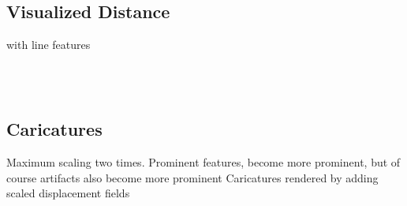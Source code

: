 \subsection{Visualized Distance}
with line features
\begin{figure}[h]
    \centering
    \\
    \\
    \caption{}
\label{fig:distmap}
\end{figure}

\subsection{Caricatures}
Maximum scaling two times. Prominent features, become more prominent, but of course artifacts also become more prominent
Caricatures rendered by adding scaled displacement fields

